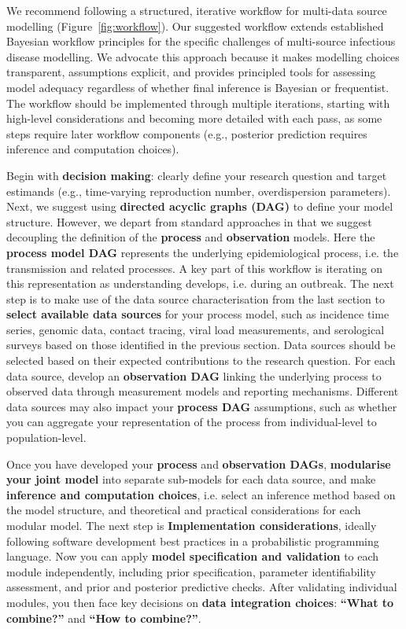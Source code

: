 \documentclass{article}
\begin{document}
We recommend following a structured, iterative workflow for multi-data source modelling (Figure~\ref{fig:workflow}). Our suggested workflow extends established Bayesian workflow principles \citep{gelman2020bayesian} for  the specific challenges of multi-source infectious disease modelling.
We advocate this approach because it makes modelling choices transparent, assumptions explicit, and provides principled tools for assessing model adequacy regardless of whether final inference is Bayesian or frequentist.
The workflow should be implemented through multiple iterations, starting with high-level considerations and becoming more detailed with each pass, as some steps require later workflow components (e.g., posterior prediction requires inference and computation choices).

Begin with \textbf{decision making}: clearly define your research question and target estimands (e.g., time-varying reproduction number, overdispersion parameters).
Next, we suggest using \textbf{directed acyclic graphs (DAG)}  to define your model structure. However, we depart from standard approaches in that we suggest decoupling the definition of the \textbf{process} and \textbf{observation} models.
Here the \textbf{process model DAG} represents the underlying epidemiological process, i.e. the transmission and related processes.
A key part of this workflow is iterating on this representation as understanding develops, i.e. during an outbreak.
The next step is to make use of the data source characterisation from the last section to \textbf{select available data sources} for your process model, such as incidence time series, genomic data, contact tracing, viral load measurements, and serological surveys based on those identified in the previous section.
Data sources should be selected based on their expected contributions to the research question.
For each data source, develop an \textbf{observation DAG} linking the underlying process to observed data through measurement models and reporting mechanisms.
Different data sources may also impact your \textbf{process DAG} assumptions, such as whether you can aggregate your representation of the process from individual-level to population-level.

Once you have developed your \textbf{process} and \textbf{observation DAGs}, \textbf{modularise your joint model} into separate sub-models for each data source, and make \textbf{inference and computation choices}, i.e. select an inference method based on the model structure, and theoretical and practical considerations for each modular model.
The next step is \textbf{Implementation considerations}, ideally following software development best practices in a probabilistic programming language.
Now you can apply \textbf{model specification and validation} to each module independently, including prior specification, parameter identifiability assessment, and prior and posterior predictive checks.
After validating individual modules, you then face key decisions on \textbf{data integration choices}: \textbf{``What to combine?''} and \textbf{``How to combine?''}.
\end{document}
